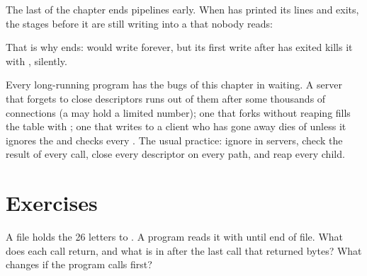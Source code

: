 The last  of the chapter ends pipelines early. When  has printed its lines and exits, the stages
before it are still writing into a  that nobody reads:


\label{out:b2:files-pipes-signals:sigpipe}

That is why  ends:  would write forever, but its first write after  has
exited kills it with , silently.

\begin{inpractice}
Every long-running program has the bugs of this chapter in waiting. A server that forgets to close descriptors runs
out of them after some thousands of connections (a  may hold a limited number); one that forks without
reaping fills the  table with ; one that writes to a client who has gone away dies of 
unless it ignores the  and checks every . The usual practice: ignore  in servers,
check the result of every call, close every descriptor on every path, and reap every child.
\end{inpractice}

\section{Exercises}\label{sec:b2:files-pipes-signals:exercises}

\begin{exercise}[$\star$]\label{exo:b2:files-pipes-signals:1}
A file holds the 26 letters  to . A program reads it with  until end of file.
What does each call return, and what is in  after the last call that returned bytes? What changes if the
program calls  first?
\end{exercise}

